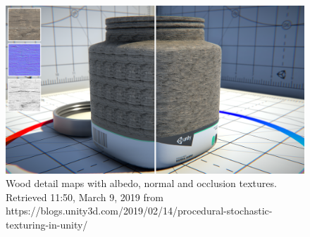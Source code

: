 \documentclass[10pt,a4paper]{article}
\begin{document}
\begin{figure}[H]
   \includegraphics[width=\textwidth, height=\textheight, keepaspectratio]{proceduralStochasticTexturingInUnityExample.png}
   \caption{Wood detail maps with albedo, normal and occlusion textures. Retrieved 11:50, March 9, 2019 from {https://blogs.unity3d.com/2019/02/14/procedural-stochastic-texturing-in-unity/}}
   \label{fig:procStocTexturing}
\end{figure}
\end{document}
